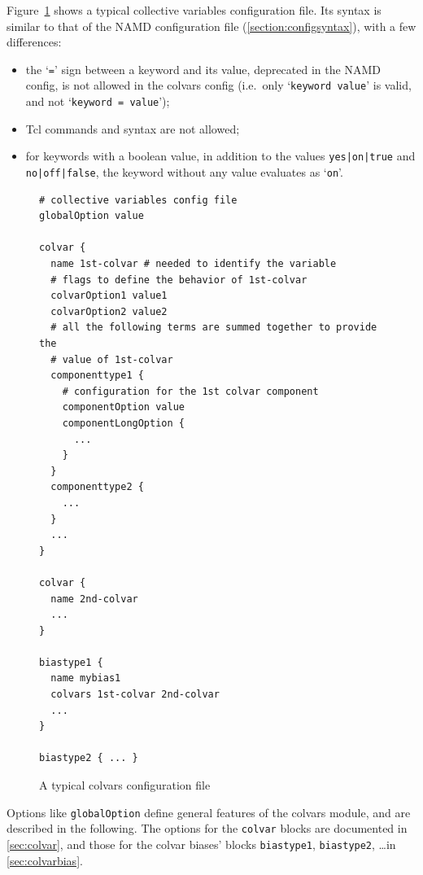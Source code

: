 Figure~\ref{fig:colvars_config} shows a typical collective variables
configuration file. Its syntax is similar to that of the
NAMD configuration file (\ref{section:configsyntax}), with a few
differences:
\begin{itemize}
\item the `\texttt{=}' sign between a keyword and its value,
  deprecated in the NAMD config, is not allowed in the colvars config
  (i.e.~only `\texttt{keyword value}' is valid, and not
  `\texttt{keyword = value}');
\item Tcl commands and syntax are not allowed;
\item for keywords with a boolean value, in addition to the values
  \texttt{yes|on|true} and \texttt{no|off|false}, the keyword without
  any value evaluates as `\texttt{on}'.
\end{itemize}

\begin{figure}[!ht]
  \footnotesize
\begin{verbatim}
# collective variables config file
globalOption value

colvar {
  name 1st-colvar # needed to identify the variable
  # flags to define the behavior of 1st-colvar
  colvarOption1 value1
  colvarOption2 value2
  # all the following terms are summed together to provide the
  # value of 1st-colvar
  componenttype1 {
    # configuration for the 1st colvar component
    componentOption value
    componentLongOption {
      ...
    }
  }
  componenttype2 {
    ...
  }
  ...
}

colvar {
  name 2nd-colvar
  ...
}

biastype1 {
  name mybias1
  colvars 1st-colvar 2nd-colvar
  ...
}

biastype2 { ... }
\end{verbatim}
  \caption{A typical colvars configuration file}
  \label{fig:colvars_config}
\end{figure}

Options like \texttt{globalOption} define general features of the
colvars module, and are described in the following.  The options for
the \texttt{colvar} blocks are documented in \ref{sec:colvar}, and
those for the colvar biases' blocks \texttt{biastype1},
\texttt{biastype2}, \ldots in \ref{sec:colvarbias}.

